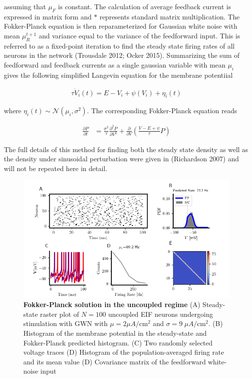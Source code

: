 \documentclass{ucetd}
\begin{document}
assuming that $\mu_{F}$ is constant. The calculation of average feedback current is expressed in matrix form and $*$ represents standard matrix multiplication. The Fokker-Planck equation is then reparameterized for Gaussian white noise with mean $\mu_{R}^{t+1}$ and variance equal to the variance of the feedforward input. This is referred to as a fixed-point iteration to find the steady state firing rates of all neurons in the network (Trousdale 2012; Ocker 2015). Summarizing the sum of feedforward and feedback currents as a single gaussian variable with mean $\mu_{i}$ gives the following simplified Langevin equation for the membrane potentiial

\begin{align}
\tau\dot{V}_{i}(t) = E - V_{i} + \psi(V_{i}) + \eta_{i}(t)
\end{align}

where $\eta_{i}(t) \sim \mathcal{N}(\mu_{i},\sigma^{2})$. The corresponding Fokker-Planck equation reads

\begin{align}
\frac{\partial P}{\partial t} &= \frac{\sigma^{2}}{\tau}\frac{\partial^{2}P}{\partial V^{2}} + \frac{\partial}{\partial V}\left(\frac{V-E+\psi}{\tau}P\right)
\end{align}

The full details of this method for finding both the steady state density as well as the density under sinusoidal perturbation were given in (Richardson 2007) and will not be repeated here in detail.

\begin{figure}[t!]
\centering
\includegraphics[width=175mm]{figure-3}
\caption{\textbf{Fokker-Planck solution in the uncoupled regime} (A) Steady-state raster plot of $N=100$ uncoupled EIF neurons undergoing stimulation with GWN with $\mu = 2\mu A/\mathrm{cm}^{2}$ and $\sigma = 9 \;\mu A/\mathrm{cm}^{2}$. (B) Histogram of the membrane potential in the steady-state and Fokker-Planck predicted histogram. (C) Two randomly selected voltage traces (D) Histogram of the population-averaged firing rate and its mean value (D) Covariance matrix of the feedforward white-noise input}
\end{figure}
\end{document}
